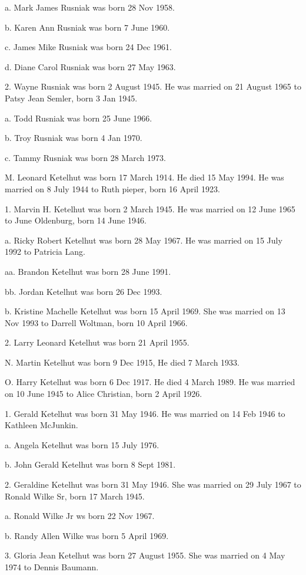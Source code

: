\documentclass[a4paper]{article}
\begin{document}
a. Mark James Rusniak was born 28 Nov 1958.

b. Karen Ann Rusniak was born 7 June 1960.

c. James Mike Rusniak was born 24 Dec 1961.

d. Diane Carol Rusniak was born 27 May 1963.

2. Wayne Rusniak was born 2 August 1945.  He was married on 21 August 1965 to Patsy Jean Semler, born 3 Jan 1945.

a. Todd Rusniak was born 25 June 1966.  

b. Troy Rusniak was born 4 Jan 1970.

c. Tammy Rusniak was born 28 March 1973.

M. Leonard Ketelhut was born 17 March 1914.  He died 15 May 1994.  He was married on 8 July 1944 to Ruth pieper, born 16 April 1923.  

1. Marvin H. Ketelhut was born 2 March 1945.  He was married on 12 June 1965 to June Oldenburg, born 14 June 1946.  

a. Ricky Robert Ketelhut was born 28 May 1967.  He was married on 15 July 1992 to Patricia Lang.

aa. Brandon Ketelhut was born 28 June 1991.

bb. Jordan Ketelhut was born 26 Dec 1993.

b. Kristine Machelle Ketelhut was born 15 April 1969.  She was married on 13 Nov 1993 to Darrell Woltman, born 10 April 1966.

2. Larry Leonard Ketelhut was born 21 April 1955.

N. Martin Ketelhut was born 9 Dec 1915,  He died 7 March 1933.

O. Harry Ketelhut was born 6 Dec 1917.  He died 4 March 1989.  He was married on 10 June 1945 to Alice Christian, born 2 April 1926.

1. Gerald Ketelhut was born 31 May 1946.  He was married on 14 Feb 1946 to Kathleen McJunkin.

a. Angela Ketelhut was born 15 July 1976.

b. John Gerald Ketelhut was born 8 Sept 1981.  

2. Geraldine Ketelhut was born 31 May 1946.  She was married on 29 July 1967 to Ronald Wilke Sr, born 17 March 1945.

a. Ronald Wilke Jr ws born 22 Nov 1967.

b. Randy Allen Wilke was born 5 April 1969.

3. Gloria Jean Ketelhut was born 27 August 1955.  She was married on 4 May 1974 to Dennis Baumann.
\end{document}
